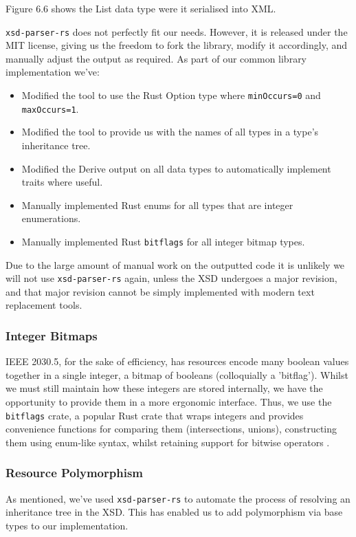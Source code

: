 Figure 6.6 shows the List data type were it serialised into XML.

\texttt{xsd-parser-rs} does not perfectly fit our needs. However, it is released under the MIT license, giving us the freedom to fork the library, modify it accordingly, and manually adjust the output as required. As part of our common library implementation we've:

\begin{itemize}
    \item Modified the tool to use the Rust Option type where \texttt{minOccurs=0} and \texttt{maxOccurs=1}.
    \item Modified the tool to provide us with the names of all types in a type's inheritance tree.
    \item Modified the Derive output on all data types to automatically implement traits where useful.  
    \item Manually implemented Rust enums for all types that are integer enumerations.
    \item Manually implemented Rust \texttt{bitflags} for all integer bitmap types.
\end{itemize}

Due to the large amount of manual work on the outputted code it is unlikely we will not use \texttt{xsd-parser-rs} again, unless the XSD undergoes a major revision, and that major revision cannot be simply implemented with modern text replacement tools.

\subsubsection{Integer Bitmaps}
IEEE 2030.5, for the sake of efficiency, has resources encode many boolean values together in a single integer, a bitmap of booleans (colloquially a 'bitflag'). Whilst we must still maintain how these integers are stored internally, we have the opportunity to provide them in a more ergonomic interface. Thus, we use the \texttt{bitflags} crate, a popular Rust crate that wraps integers and provides convenience functions for comparing them (intersections, unions), constructing them using enum-like syntax, whilst retaining support for bitwise operators \cite{bitflags}. 

\subsubsection{Resource Polymorphism}
As mentioned, we've used \texttt{xsd-parser-rs} to automate the process of resolving an inheritance tree in the XSD. This has enabled us to add polymorphism via base types to our implementation.

